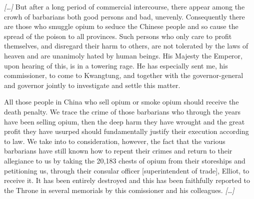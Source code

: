 \begin{fancyquote}
	\emph{[\ldots]} But after a long period of commercial intercourse, there appear among the crowh of barbarians both good persons and bad, unevenly. Consequently there are those who smuggle opium to seduce the Chinese people and so cause the spread of the poison to all provinces. Such persons who only care to profit themselves, and disregard their harm to others, are not tolerated by the laws of heaven and are unanimoly hated by human beings. His Majesty the Emperor, upon hearing of this, is in a towering rage. He has especially sent me, his commissioner, to come to Kwangtung, and together with the governor-general and governor jointly to investigate and settle this matter.\par
	All those people in China who sell opium or smoke opium should receive the death penalty. We trace the crime of those barbarians who through the years have been selling opium, then the deep harm they have wrought and the great profit they have usurped should fundamentally justify their execution according to law. We take into to consideration, however, the fact that the various barbarians have still known how to repent their crimes and return to their allegiance to us by taking the 20,183 chests of opium from their storeships and petitioning us, through their consular officer [superintendent of trade], Elliot, to receive it. It has been entirely destroyed and this has been faithfully reported to the Throne in several memorials by this comissioner and his colleagues. \emph{[\ldots]}
\end{fancyquote}
